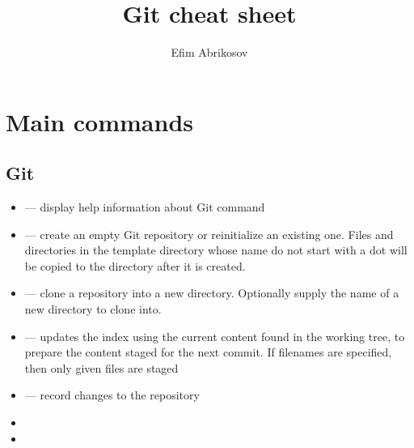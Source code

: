 \documentclass[12pt]{article}
\begin{document}
\title{Git cheat sheet}
\author{Efim Abrikosov}
\maketitle


\section{Main commands}
\subsection{Git}
\begin{itemize}
  \item {} --- display help information about Git command
  \item {} --- create an empty Git repository or reinitialize an existing one. Files and directories in the template directory whose name do not start with a dot will be copied to the directory after it is created.
  \item {} --- clone a repository into a new directory. Optionally supply the name of a new directory to clone into.
  \item {} --- updates the index using the current content found in the working tree, to prepare the content staged for the next commit. If filenames are specified, then only given files are staged
  \item {} --- record changes to the repository
  \item {}
  \item {}
\end{itemize}
\end{document}
